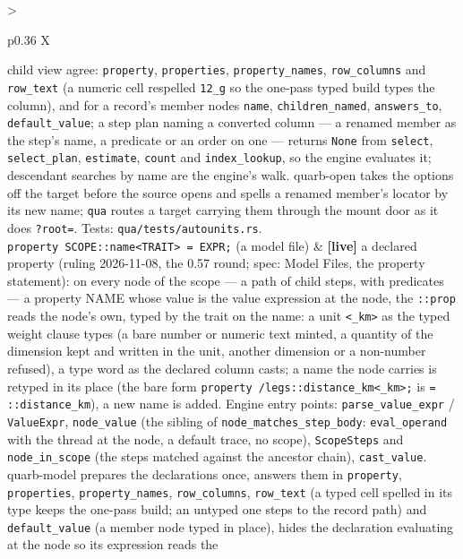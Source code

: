 \documentclass{report}
\newcommand{\live}{\textbf{\textcolor{blue!60!black}{[live]}}\xspace}
\begin{document}
\begin{xltabular}{\textwidth}{>{\raggedright\arraybackslash}p{0.36\textwidth} X}
    child view agree: \texttt{property}, \texttt{properties},
    \texttt{property\_names}, \texttt{row\_columns} and
    \texttt{row\_text} (a numeric cell respelled \texttt{12\_g} so the
    one-pass typed build types the column), and for a record's member
    nodes \texttt{name}, \texttt{children\_named}, \texttt{answers\_to},
    \texttt{default\_value}; a step plan naming a converted column — a
    renamed member as the step's name, a predicate or an order on one —
    returns \texttt{None} from \texttt{select}, \texttt{select\_plan},
    \texttt{estimate}, \texttt{count} and \texttt{index\_lookup}, so the
    engine evaluates it; descendant searches by name are the engine's
    walk. quarb-open takes the options off the target before the
    source opens and spells a renamed member's locator by its new
    name; \texttt{qua} routes a target carrying them through the mount
    door as it does \texttt{?root=}. Tests:
    \texttt{qua/tests/autounits.rs}. \\
\texttt{property SCOPE::name<TRAIT> = EXPR;} (a model file)
  & \live a declared property (ruling 2026-11-08, the 0.57 round;
    spec: Model Files, the property statement): on every node of the
    scope — a path of child steps, with predicates — a property NAME
    whose value is the value expression at the node, the \texttt{::prop}
    reads the node's own, typed by the trait on the name: a unit
    \texttt{<\_km>} as the typed weight clause types (a bare number or
    numeric text minted, a quantity of the dimension kept and written
    in the unit, another dimension or a non-number refused), a type
    word as the declared column casts; a name the node carries is
    retyped in its place (the bare form \texttt{property
    /legs::distance\_km<\_km>;} is \texttt{= ::distance\_km}), a new
    name is added. Engine entry points: \texttt{parse\_value\_expr} /
    \texttt{ValueExpr}, \texttt{node\_value} (the sibling of
    \texttt{node\_matches\_step\_body}: \texttt{eval\_operand} with the
    thread at the node, a default trace, no scope),
    \texttt{ScopeSteps} and \texttt{node\_in\_scope} (the steps matched
    against the ancestor chain), \texttt{cast\_value}. quarb-model
    prepares the declarations once, answers them in \texttt{property},
    \texttt{properties}, \texttt{property\_names}, \texttt{row\_columns},
    \texttt{row\_text} (a typed cell spelled in its type keeps the
    one-pass build; an untyped one steps to the record path) and
    \texttt{default\_value} (a member node typed in place), hides the
    declaration evaluating at the node so its expression reads the

\end{xltabular}
\end{document}
